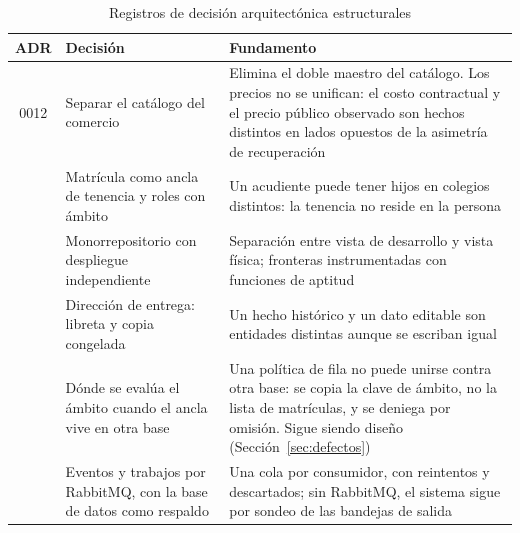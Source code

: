 \begin{table}[htbp]
\centering
\caption{Registros de decisión arquitectónica estructurales}
\label{tab:adr}
\small
\begin{tabular}{@{}cp{5.0cm}p{7.6cm}@{}}
\toprule
\textbf{ADR} & \textbf{Decisión} & \textbf{Fundamento} \\
\midrule
0012 & Separar el catálogo del comercio & Elimina el doble maestro del catálogo. Los precios
no se unifican: el costo contractual y el precio público observado son hechos distintos en
lados opuestos de la asimetría de recuperación \\
\addlinespace
0013 & Matrícula como ancla de tenencia y roles con ámbito & Un acudiente puede tener hijos
en colegios distintos: la tenencia no reside en la persona \\
\addlinespace
0014 & Monorrepositorio con despliegue independiente & Separación entre vista de
desarrollo y vista física; fronteras instrumentadas con funciones de aptitud \\
\addlinespace
0015 & Dirección de entrega: libreta y copia congelada & Un hecho histórico y un dato
editable son entidades distintas aunque se escriban igual \\
\addlinespace
0016 & Dónde se evalúa el ámbito cuando el ancla vive en otra base & Una política de fila
no puede unirse contra otra base: se copia la clave de ámbito, no la lista de matrículas, y
se deniega por omisión. Sigue siendo diseño (Sección~\ref{sec:defectos}) \\
\addlinespace
0046 & Eventos y trabajos por RabbitMQ, con la base de datos como respaldo & Una cola por
consumidor, con reintentos y descartados; sin RabbitMQ, el sistema sigue por sondeo de las
bandejas de salida \\
\bottomrule
\end{tabular}
\end{table}

